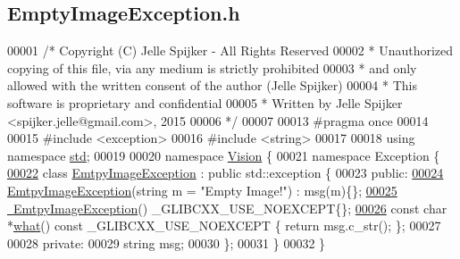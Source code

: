 \hypertarget{_empty_image_exception_8h_source}{}\subsection{Empty\+Image\+Exception.\+h}
\label{_empty_image_exception_8h_source}

\begin{DoxyCode}
00001 \textcolor{comment}{/* Copyright (C) Jelle Spijker - All Rights Reserved}
00002 \textcolor{comment}{ * Unauthorized copying of this file, via any medium is strictly prohibited}
00003 \textcolor{comment}{ * and only allowed with the written consent of the author (Jelle Spijker)}
00004 \textcolor{comment}{ * This software is proprietary and confidential}
00005 \textcolor{comment}{ * Written by Jelle Spijker <spijker.jelle@gmail.com>, 2015}
00006 \textcolor{comment}{ */}
00007 
00013 \textcolor{preprocessor}{#pragma once}
00014 
00015 \textcolor{preprocessor}{#include <exception>}
00016 \textcolor{preprocessor}{#include <string>}
00017 
00018 \textcolor{keyword}{using namespace }\hyperlink{namespacestd}{std};
00019 
00020 \textcolor{keyword}{namespace }\hyperlink{namespace_vision}{Vision} \{
00021 \textcolor{keyword}{namespace }Exception \{
\hypertarget{_empty_image_exception_8h_source_l00022}{}\hyperlink{class_vision_1_1_exception_1_1_emtpy_image_exception}{00022} \textcolor{keyword}{class }\hyperlink{class_vision_1_1_exception_1_1_emtpy_image_exception}{EmtpyImageException} : \textcolor{keyword}{public} std::exception \{
00023 \textcolor{keyword}{public}:
\hypertarget{_empty_image_exception_8h_source_l00024}{}\hyperlink{class_vision_1_1_exception_1_1_emtpy_image_exception_ac5ffe210a9b0334c94b30960d4b4a3e8}{00024}   \hyperlink{class_vision_1_1_exception_1_1_emtpy_image_exception_ac5ffe210a9b0334c94b30960d4b4a3e8}{EmtpyImageException}(\textcolor{keywordtype}{string} m = \textcolor{stringliteral}{"Empty Image!"}) : msg(m)\{\};
\hypertarget{_empty_image_exception_8h_source_l00025}{}\hyperlink{class_vision_1_1_exception_1_1_emtpy_image_exception_a525fb499437fb7b2d8612118430549ec}{00025}   \hyperlink{class_vision_1_1_exception_1_1_emtpy_image_exception_a525fb499437fb7b2d8612118430549ec}{~EmtpyImageException}() \_GLIBCXX\_USE\_NOEXCEPT\{\};
\hypertarget{_empty_image_exception_8h_source_l00026}{}\hyperlink{class_vision_1_1_exception_1_1_emtpy_image_exception_a07ecf1da15bdf9d26b32ee9044b529f0}{00026}   \textcolor{keyword}{const} \textcolor{keywordtype}{char} *\hyperlink{class_vision_1_1_exception_1_1_emtpy_image_exception_a07ecf1da15bdf9d26b32ee9044b529f0}{what}() const \_GLIBCXX\_USE\_NOEXCEPT \{ \textcolor{keywordflow}{return} msg.c\_str(); \};
00027 
00028 \textcolor{keyword}{private}:
00029   \textcolor{keywordtype}{string} msg;
00030 \};
00031 \}
00032 \}
\end{DoxyCode}
